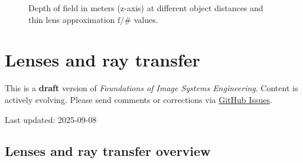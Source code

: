 \documentclass[
  letterpaper,
]{book}
\begin{document}
\begin{figure}


\caption{\label{fig-optics-dof}Depth of field in meters (z-axis) at
different object distances and thin lens approximation \(\mathrm{f}/\#\)
values.}

\end{figure}%

\chapter{Lenses and ray transfer}\label{sec-optics-morelenses}

\begin{tcolorbox}[enhanced jigsaw, opacityback=0, breakable, coltitle=black, leftrule=.75mm, left=2mm, colframe=quarto-callout-warning-color-frame, opacitybacktitle=0.6, bottomtitle=1mm, bottomrule=.15mm, toprule=.15mm, title=\textcolor{quarto-callout-warning-color}{\faExclamationTriangle}\hspace{0.5em}{Work in Progress}, titlerule=0mm, toptitle=1mm, colback=white, rightrule=.15mm, colbacktitle=quarto-callout-warning-color!10!white, arc=.35mm]

This is a \textbf{draft} version of \emph{Foundations of Image Systems
Engineering}. Content is actively evolving. Please send comments or
corrections via \href{https://github.com/wandell/FISE-git/issues}{GitHub
Issues}.

Last updated: 2025-09-08

\end{tcolorbox}

\section{Lenses and ray transfer
overview}\label{sec-optics-morelenses-overview}
\end{document}
